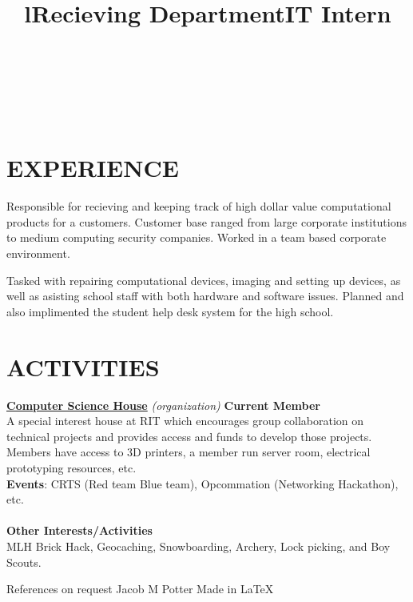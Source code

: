 \documentclass[line,margin]{res}
\begin{document}
\begin{resume}
\begin{format}
\title{l}\\
\\
\body\\
\end{format}
\section{EXPERIENCE}
\title{\textbf{Recieving Department}}
\begin{position}
    Responsible for recieving and keeping track of high dollar value 
    computational products for a customers. Customer base ranged from large 
    corporate institutions to medium computing security companies. Worked in a
    team based corporate environment.
\end{position}
\title{\textbf{IT Intern}}
\begin{position}
    Tasked with repairing computational devices, imaging and setting up devices, 
    as well as asisting school staff with both hardware and software issues. 
    Planned and also implimented the student help desk system for the high 
    school.
\end{position}

\section{ACTIVITIES}
\href{https://csh.rit.edu}{\textbf{Computer Science House}}
{\sl (organization)}\hfill
\textbf{Current Member}\\
A special interest house at RIT which encourages group collaboration on technical 
projects and provides access and funds to develop those projects. Members have 
access to 3D printers, a member run server room, electrical prototyping 
resources, etc.\\
\textbf{Events}: 
CRTS (Red team Blue team), Opcommation (Networking Hackathon), etc.\\\\
\textbf{Other Interests/Activities}\\
MLH Brick Hack, Geocaching, Snowboarding, Archery, Lock picking, and Boy Scouts.

\end{resume}

\scriptsize{References on request} \hfill 
\scriptsize{Jacob M Potter} \hfill 
\scriptsize{Made in \LaTeX}
\end{document}
